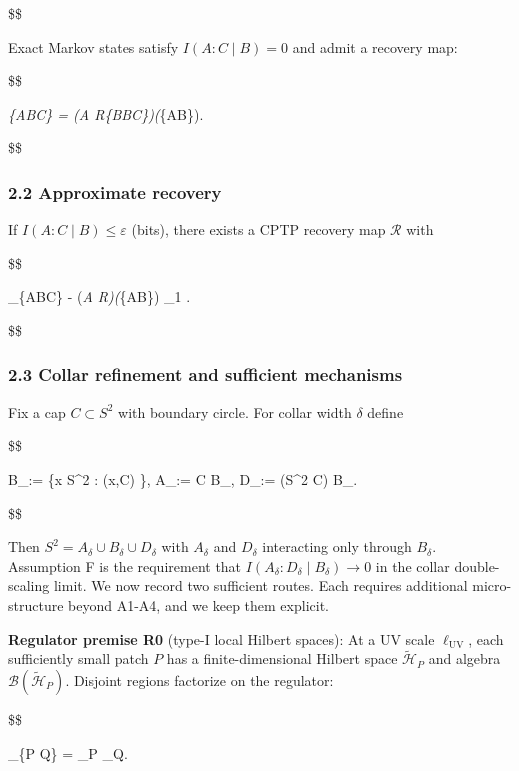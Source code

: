 \documentclass[11pt,a4paper]{article}
\theoremstyle{remark}
\begin{document}
\$\$

Exact Markov states satisfy \(I(A:C \mid B) = 0\) and admit a recovery map:

\$\$

\rho\emph{\{ABC\} = (\emph{A \otimes \mathcal R}\{B\to BC\})(\rho}\{AB\}).

\$\$

\subsubsection{2.2 Approximate recovery}\label{approximate-recovery}

If \(I(A:C \mid B) \le \varepsilon\) (bits), there exists a CPTP recovery map \(\mathcal{R}\) with

\$\$

\textbar{} \rho\_\{ABC\} - (\emph{A \otimes \mathcal R)(\rho}\{AB\}) \textbar\_1
 .

\$\$

\subsubsection{2.3 Collar refinement and sufficient mechanisms}\label{collar-refinement-and-sufficient-mechanisms}

Fix a cap \(C \subset S^2\) with boundary circle. For collar width \(\delta\) define

\$\$

B\_\delta := \{x \in S\^{}2 : (x,\partial C) \le \delta\},
\qquad
A\_\delta := C \setminus B\_\delta,
\qquad
D\_\delta := (S\^{}2 \setminus C) \setminus B\_\delta.

\$\$

Then \(S^2 = A_\delta \cup B_\delta \cup D_\delta\) with \(A_\delta\) and \(D_\delta\)
interacting only through \(B_\delta\). Assumption F is the requirement that
\(I(A_\delta:D_\delta \mid B_\delta) \to 0\) in the collar double-scaling limit. We now
record two sufficient routes. Each requires additional micro-structure beyond
A1-A4, and we keep them explicit.

\textbf{Regulator premise R0} (type-I local Hilbert spaces): At a UV scale \(\ell_{\mathrm{UV}}\), each
sufficiently small patch \(P\) has a finite-dimensional Hilbert space
\(\tilde{\mathcal H}_P\) and algebra \(\mathcal B(\tilde{\mathcal H}_P)\). Disjoint
regions factorize on the regulator:

\$\$

\_\{P \sqcup Q\} = \_P \otimes {}\_Q.
\end{document}
